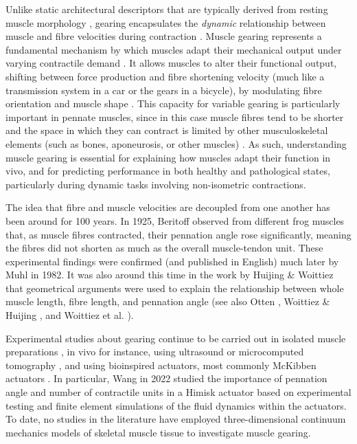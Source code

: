 \documentclass{sfuthesis}
\numberwithin{equation}{section}
\numberwithin{figure}{chapter}
\numberwithin{table}{chapter}
\theoremstyle{definition}
\begin{document}
Unlike static architectural descriptors that are typically derived from resting muscle morphology \cite{LieberFriden2000}, gearing encapsulates the \textit{dynamic} relationship between muscle and fibre velocities during contraction \cite{Azizi2008VariableGearing,DickWakeling2017ShiftingGears}. Muscle gearing represents a fundamental mechanism by which muscles adapt their mechanical output under varying contractile demand \cite{Azizi2008VariableGearing}. It allows muscles to alter their functional output, shifting between force production and fibre shortening velocity (much like a transmission system in a car or the gears in a bicycle), by modulating fibre orientation and muscle shape \cite{Eng2018,WakelingEtAl2011MovementMechanics}. This capacity for variable gearing is particularly important in pennate muscles, since in this case muscle fibres tend to be shorter and the space in which they can contract is limited by other musculoskeletal elements (such as bones, aponeurosis, or other muscles) \cite{Eng2018}. As such, understanding muscle gearing is essential for explaining how muscles adapt their function in vivo, and for predicting performance in both healthy and pathological states, particularly during dynamic tasks involving non-isometric contractions.

The idea that fibre and muscle velocities are decoupled from one another has been around for 100 years. In 1925, Beritoff \cite{Beritoff1925} observed from different frog muscles that, as muscle fibres contracted, their pennation angle rose significantly, meaning the fibres did not shorten as much as the overall muscle-tendon unit. These experimental findings were confirmed (and published in English) much later by Muhl \cite{Muhl1982} in 1982. It was also around this time in the work by Huijing \& Woittiez \cite{HuijingWoittiez1983PlanimetricModel} that geometrical arguments were used to explain the relationship between whole muscle length, fibre length, and pennation angle (see also Otten \cite{Otten1984}, Woittiez \& Huijing \cite{WoittiezHuijing1984Notes}, and Woittiez et al. \cite{WoittiezEtAl1984ThreeDimensional}).

Experimental studies about gearing continue to be carried out in isolated muscle preparations \cite{Azizi2008VariableGearing,AziziRoberts2014,EngRoberts2018,Holt2016}, in vivo for instance, using ultrasound \cite{BohmEtAl2019, DickWakeling2017ShiftingGears, RandhawaJackmanWakeling2013,WakelingEtAl2011MovementMechanics} or microcomputed tomography \cite{LeavyRichardsPorro2025}, and using bioinspired actuators, most commonly McKibben actuators \cite{AziziRoberts2013McKibben,Liu2021BioinspiredActuators, SlebodaRobertsAzizi2024, Wang2022LoadDependentVariableGearing}. In particular, Wang \cite{Wang2022LoadDependentVariableGearing} in 2022 studied the importance of pennation angle and number of contractile units in a Himisk actuator based on experimental testing and finite element simulations of the fluid dynamics within the actuators. To date, no studies in the literature have employed three-dimensional continuum mechanics models of skeletal muscle tissue to investigate muscle gearing.
\end{document}
